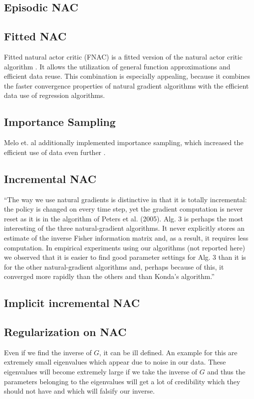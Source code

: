 \subsection{Episodic NAC}

\subsection{Fitted NAC}
Fitted natural actor critic (FNAC) is a fitted version of the natural actor critic algorithm \cite{melo2008fitted}. It allows the utilization of general function approximations and efficient data reuse. This combination is especially appealing, because it combines the faster convergence properties of natural gradient algorithms with the efficient data use of regression algorithms.

\subsection{Importance Sampling}
Melo et. al additionally implemented importance sampling, which increased the efficient use of data even further \cite{melo2008fitted}.

\subsection{Incremental NAC}
``The way we use natural gradients is distinctive in that it is totally incremental: the policy is changed on every time step, yet the gradient computation is never reset as it is in the algorithm of Peters et al. (2005). Alg. 3 is perhaps the most interesting of the three natural-gradient algorithms. It never explicitly stores an estimate of the inverse Fisher information matrix and, as a result, it requires less computation. In empirical experiments using our algorithms (not reported here) we observed that it is easier to ﬁnd good parameter settings for Alg. 3 than it is for the other natural-gradient algorithms and, perhaps because of this, it converged more rapidly than the others and than Konda’s algorithm.'' \cite{bhatnagar2008incremental}

\subsection{Implicit incremental NAC}



\subsection{Regularization on NAC}
	Even if we find the inverse of $G$, it can be ill defined. An example for this are extremely small eigenvalues which appear due to noise in our data. These eigenvalues will become extremely large if we take the inverse of $G$ and thus the parameters belonging to the eigenvalues will get a lot of credibility which they should not have and which will falsify our inverse.
	
